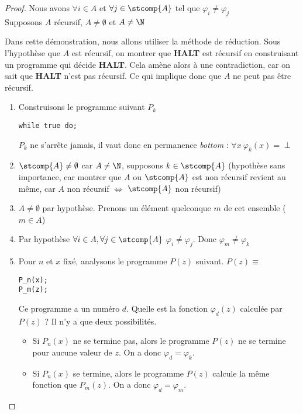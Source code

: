 \begin{proof}
Nous avons $\forall i \in A$ et $\forall j \in \stcomp{A}$ tel que $\varphi_i \neq
\varphi_j$\\
Supposons $A$ récursif, $A \neq \emptyset$ et $A\neq \N$

Dans cette démonstration, nous allons utiliser la méthode de réduction.
Sous l'hypothèse que $A$ est récursif, on montrer que \textbf{HALT} est récursif en construisant un programme qui décide \textbf{HALT}.  Cela amène alors à une contradiction, car on sait que \textbf{HALT} n'est pas récursif.  Ce qui implique donc que $A$ ne peut pas être récursif.

\begin{enumerate}
	\item Construisons le programme suivant $P_k$
		\begin{lstlisting}
while true do;
		\end{lstlisting}
			$P_k$ ne s'arrête jamais, il vaut donc en permanence \textit{bottom} : $\forall x \ \varphi_k(x) = \perp$

	\item $\stcomp{A}\neq \emptyset$ car $A \neq \N$,
	supposons $k\in \stcomp{A}$ (hypothèse sans importance, car montrer que
	$A$ ou $\stcomp{A}$ est non récursif revient au même, car $A$ non
	récursif $ \Leftrightarrow $ $\stcomp{A}$ non récursif)
	\item $A\neq \emptyset$ par hypothèse.  Prenons un élément quelconque $m$ de cet ensemble  ($m\in A$)
	\item Par hypothèse  $\forall i \in A, \forall j \in \stcomp{A}$ $\varphi_i \neq \varphi_j$.  Donc
		$\varphi_m \neq \varphi_k$
	\item Pour $n$ et $x$ fixé, analysons le programme $P(z)$ suivant.
		$P(z) \equiv $
		\begin{lstlisting}
P_n(x);
P_m(z);
		\end{lstlisting}

			Ce programme a un numéro $d$.  Quelle est la fonction $\varphi_d(z)$ calculée par $P(z)$ ? Il n'y a que deux possibilités.
			\begin{itemize}
				\item Si $P_n(x)$ ne se termine pas, alors le programme $P(z)$ ne se termine pour aucune valeur de $z$. On a donc $\varphi_d =\varphi_k$.
				\item Si $P_n(x)$ se termine, alors le programme $P(z)$ calcule la même fonction que $P_m(z)$. On a donc $\varphi_d =\varphi_m$.
			\end{itemize}


\end{enumerate}
\end{proof}
